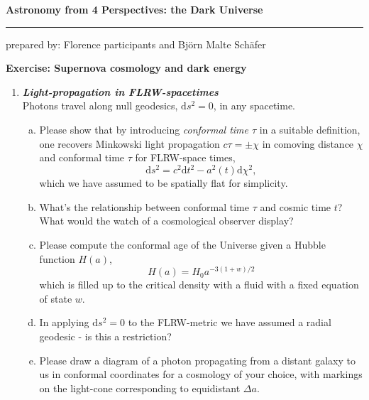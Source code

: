 \documentclass[a4paper,12pt]{article}
\newcommand{\question}[1]{\textbf{\textit{#1}}}
\newcommand{\HRule}{\rule{\linewidth}{0.3mm}}
\newcommand{\dd}{\mathrm{d}}
\begin{document}
\pagestyle{empty}

\begin{center}
\LARGE \textbf{Astronomy from 4 Perspectives: the Dark Universe}
\HRule
\end{center}
\begin{flushright}
prepared by: Florence participants and Bj{\"o}rn Malte Sch{\"a}fer
\end{flushright}
\begin{center}
{\Large \textbf{Exercise: Supernova cosmology and dark energy}}
\end{center}
\vspace{5mm}

\begin{enumerate}

\item \question{Light-propagation in FLRW-spacetimes}\\
Photons travel along null geodesics, $\dd s^2=0$, in any spacetime. 
\begin{enumerate}[(a)]
\item{Please show that by introducing {\em conformal time $\tau$} in a suitable definition, one recovers Minkowski light propagation $c\tau = \pm\chi$ in comoving distance $\chi$ and conformal time $\tau$ for FLRW-space times,
\begin{equation}
\dd s^2 = c^2\dd t^2 - a^2(t)\dd\chi^2,
\end{equation}
which we have assumed to be spatially flat for simplicity.}
\item{What's the relationship between conformal time $\tau$ and cosmic time $t$? What would the watch of a cosmological observer display?}
\item{Please compute the conformal age of the Universe given a Hubble function $H(a)$,
\begin{equation}
H(a) = H_0 a^{-3(1+w)/2}
\end{equation}
which is filled up to the critical density with a fluid with a fixed equation of state $w$.
}
\item{In applying $\dd s^2=0$ to the FLRW-metric we have assumed a radial geodesic - is this a restriction?}
\item{Please draw a diagram of a photon propagating from a distant galaxy to us in conformal coordinates for a cosmology of your choice, with markings on the light-cone corresponding to equidistant $\Delta a$.}
\end{enumerate}



\end{enumerate}
\end{document}
